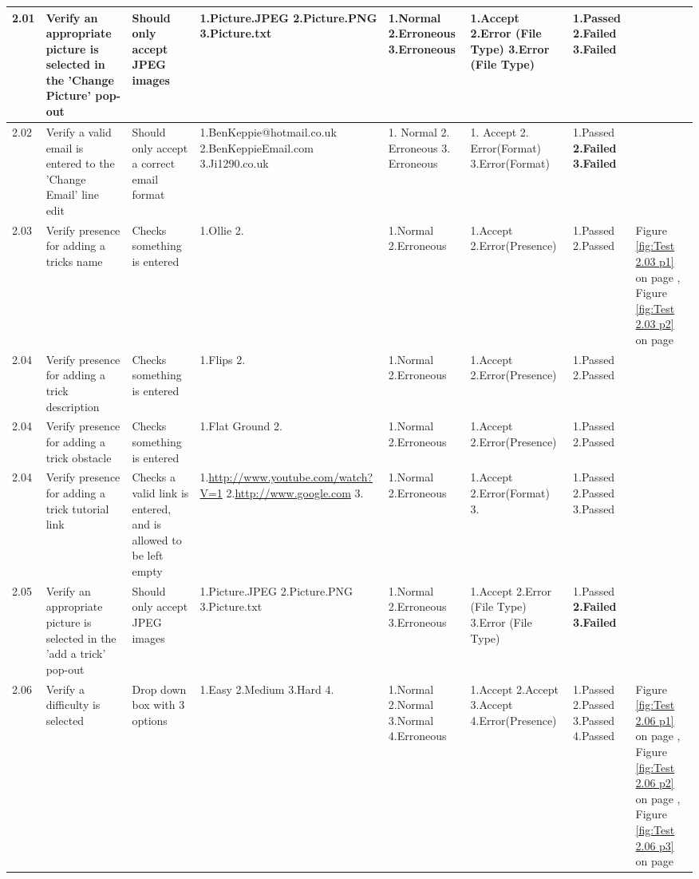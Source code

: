 \begin{landscape}
\begin{center}
\begin{longtable}{|p{1.5cm}|p{2.5cm}|p{2.5cm}|p{2cm}|p{2cm}|p{2cm}|p{2cm}|p{2cm}|}
2.01 & Verify an appropriate picture is selected in the 'Change Picture' pop-out & Should only accept JPEG images & 1.Picture.JPEG 2.Picture.PNG 3.Picture.txt & 1.Normal 2.Erroneous 3.Erroneous & 1.Accept 2.Error (File Type) 3.Error (File Type) & 1.Passed \textbf{2.Failed 3.Failed} & \\ \hline

2.02 & Verify a valid email is entered to the 'Change Email' line edit & Should only accept a correct email format & 1.BenKeppie@hotmail.co.uk 2.BenKeppieEmail.com  3.Ji1290.co.uk & 1. Normal 2. Erroneous 3. Erroneous & 1. Accept 2. Error(Format) 3.Error(Format) & 1.Passed \textbf{2.Failed 3.Failed} & \\ \hline

2.03 & Verify presence for adding a tricks name & Checks something is entered & 1.Ollie 2.  & 1.Normal 2.Erroneous & 1.Accept 2.Error(Presence) & 1.Passed 2.Passed & Figure \ref{fig:Test 2.03 p1} on page \pageref{fig:Test 2.03 p1}, Figure \ref{fig:Test 2.03 p2} on page \pageref{fig:Test 2.03 p2}\\ \hline

2.04 & Verify presence for adding a trick description & Checks something is entered & 1.Flips 2. & 1.Normal 2.Erroneous & 1.Accept 2.Error(Presence) & 1.Passed 2.Passed & \\ \hline

2.04 & Verify presence for adding a trick obstacle & Checks something is entered & 1.Flat Ground 2. & 1.Normal 2.Erroneous & 1.Accept 2.Error(Presence) & 1.Passed 2.Passed & \\ \hline

2.04 & Verify presence for adding a trick tutorial link & Checks a valid link is entered, and is allowed to be left empty & 1.\url{http://www.youtube.com/watch?V=1} 2.\url{http://www.google.com} 3. & 1.Normal 2.Erroneous & 1.Accept 2.Error(Format) 3. & 1.Passed 2.Passed 3.Passed & \\ \hline

2.05 & Verify an appropriate picture is selected in the 'add a trick' pop-out & Should only accept JPEG images & 1.Picture.JPEG 2.Picture.PNG 3.Picture.txt & 1.Normal 2.Erroneous 3.Erroneous & 1.Accept 2.Error (File Type) 3.Error (File Type) & 1.Passed \textbf{2.Failed 3.Failed} & \\ \hline

2.06 & Verify a difficulty is selected & Drop down box with 3 options & 1.Easy 2.Medium 3.Hard 4. & 1.Normal 2.Normal 3.Normal 4.Erroneous & 1.Accept 2.Accept 3.Accept 4.Error(Presence) & 1.Passed 2.Passed 3.Passed 4.Passed & Figure \ref{fig:Test 2.06 p1} on page \pageref{fig:Test 2.06 p1}, Figure \ref{fig:Test 2.06 p2} on page \pageref{fig:Test 2.06 p2}, Figure \ref{fig:Test 2.06 p3} on page \pageref{fig:Test 2.06 p3} \\ \hline



\end{longtable}
\end{center}
\end{landscape}
